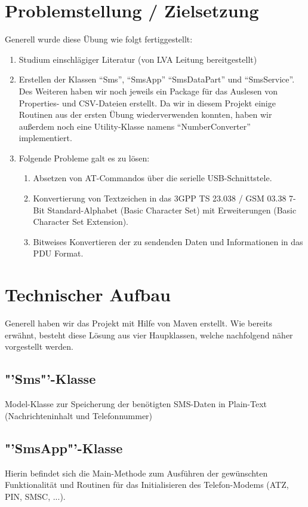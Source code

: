 \documentclass[paper=a4, fontsize=11pt]{scrartcl}
\begin{document}
\section{Problemstellung / Zielsetzung}
Generell wurde diese Übung wie folgt fertiggestellt:
\begin{enumerate}
	\item Studium einschlägiger Literatur (von LVA Leitung bereitgestellt)
	\item Erstellen der Klassen "`Sms"', "`SmsApp"' "`SmsDataPart"' und "`SmsService"'. Des Weiteren haben wir noch jeweils ein Package für das Auslesen von Properties- und CSV-Dateien erstellt. Da wir in diesem Projekt einige Routinen aus der ersten Übung wiederverwenden konnten, haben wir außerdem noch eine Utility-Klasse namens "`NumberConverter"' implementiert.
	\item Folgende Probleme galt es zu lösen:
		\begin{enumerate}
			\item Absetzen von AT-Commandos über die serielle USB-Schnittstele.
			\item Konvertierung von Textzeichen in das 3GPP TS 23.038 / GSM 03.38 7-Bit Standard-Alphabet (Basic Character Set) mit Erweiterungen (Basic Character Set Extension).
			\item Bitweises Konvertieren der zu sendenden Daten und Informationen in das PDU Format.
		\end{enumerate}
\end{enumerate}

\section{Technischer Aufbau}
Generell haben wir das Projekt mit Hilfe von Maven erstellt. Wie bereits erwähnt, besteht diese Lösung aus vier Haupklassen, welche nachfolgend näher vorgestellt werden.

\subsection{"'Sms"'-Klasse}
Model-Klasse zur Speicherung der benötigten SMS-Daten in Plain-Text (Nachrichteninhalt und Telefonnummer)

\subsection{"'SmsApp"'-Klasse}
Hierin befindet sich die Main-Methode zum Ausführen der gewünschten Funktionalität und Routinen für das Initialisieren des Telefon-Modems (ATZ, PIN, SMSC, ...).
\end{document}
